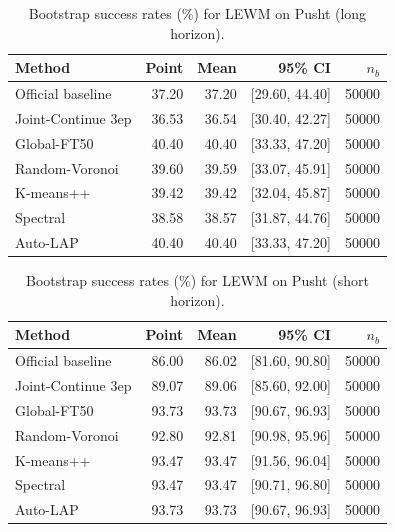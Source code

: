 \begin{table}[t]
\centering
\small
\caption{Bootstrap success rates (\%) for LEWM on Pusht (long horizon).}
\begin{tabular}{lrrrr}
\toprule
Method & Point & Mean & 95\% CI & $n_b$ \\
\midrule
Official baseline & 37.20 & 37.20 & [29.60, 44.40] & 50000 \\
Joint-Continue 3ep & 36.53 & 36.54 & [30.40, 42.27] & 50000 \\
Global-FT50 & 40.40 & 40.40 & [33.33, 47.20] & 50000 \\
Random-Voronoi & 39.60 & 39.59 & [33.07, 45.91] & 50000 \\
K-means++ & 39.42 & 39.42 & [32.04, 45.87] & 50000 \\
Spectral & 38.58 & 38.57 & [31.87, 44.76] & 50000 \\
Auto-LAP & 40.40 & 40.40 & [33.33, 47.20] & 50000 \\
\bottomrule
\end{tabular}
\end{table}

\begin{table}[t]
\centering
\small
\caption{Bootstrap success rates (\%) for LEWM on Pusht (short horizon).}
\begin{tabular}{lrrrr}
\toprule
Method & Point & Mean & 95\% CI & $n_b$ \\
\midrule
Official baseline & 86.00 & 86.02 & [81.60, 90.80] & 50000 \\
Joint-Continue 3ep & 89.07 & 89.06 & [85.60, 92.00] & 50000 \\
Global-FT50 & 93.73 & 93.73 & [90.67, 96.93] & 50000 \\
Random-Voronoi & 92.80 & 92.81 & [90.98, 95.96] & 50000 \\
K-means++ & 93.47 & 93.47 & [91.56, 96.04] & 50000 \\
Spectral & 93.47 & 93.47 & [90.71, 96.80] & 50000 \\
Auto-LAP & 93.73 & 93.73 & [90.67, 96.93] & 50000 \\
\bottomrule
\end{tabular}
\end{table}

